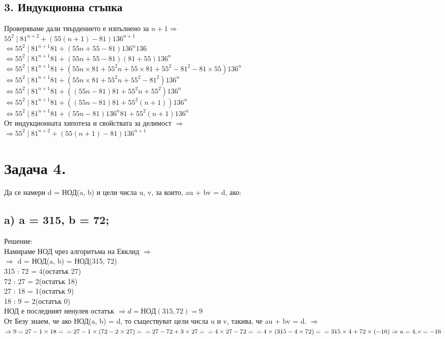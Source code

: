 \documentclass[10pt]{article}
\begin{document}
\subsection*{3. Индукционна стъпка}
Проверяваме дали твърдението е изпълнено за $n+1 \Rightarrow$\\
$55^2 \mid 81^{n+2} + (55(n + 1) -81)136^{n+1}$\\
$\Leftrightarrow 55^2 \mid 81^{n + 1}81 + (55n + 55 - 81)136^n136$\\
$\Leftrightarrow 55^2 \mid 81^{n + 1}81 + (55n + 55 - 81)(81 + 55)136^n$\\
$\Leftrightarrow 55^2 \mid 81^{n + 1}81 + (55n \times 81 + 55^2n + 55 \times 81 + 55^2 - 81^2 - 81 \times 55)136^n$\\
$\Leftrightarrow 55^2 \mid 81^{n + 1}81 + (55n \times 81 + 55^2n + 55^2 - 81^2)136^n$\\
$\Leftrightarrow 55^2 \mid 81^{n + 1}81 + ((55n - 81)81  + 55^2n + 55^2)136^n$\\
$\Leftrightarrow 55^2 \mid 81^{n + 1}81 + ((55n - 81)81  + 55^2(n + 1))136^n$\\
$\Leftrightarrow 55^2 \mid 81^{n + 1}81 + (55n - 81)136^n81  + 55^2(n + 1)136^n$\\
От индукционната хипотеза и свойствата за делимост $\Rightarrow$\\
$\Rightarrow 55^2 \mid 81^{n+2} + (55(n + 1) -81)136^{n+1}$

\section*{Задача 4.}
Да се намери d = НОД(a, b) и цели числа u, v, за които, au + bv = d, ако:\\
\subsection*{a) a = 315, b = 72;}
Решение:\\
Намираме НОД чрез алгоритъма на Евклид $\Rightarrow$\\
$\Rightarrow$ d = НОД(a, b) = НОД(315, 72)\\
315 : 72 = 4(остатък 27)\\
72 : 27 = 2(остатък 18)\\
27 : 18 = 1(остатък 9)\\
18 : 9 = 2(остатък 0)\\
НОД е последният ненулев остатък $\Rightarrow d = НОД(315, 72) = 9$\\
От Безу знаем, че ако НОД(a, b) = d, то съществуват цели числа u и v, такива, че au + bv = d. $\Rightarrow$\\
$\Rightarrow 9 = 27 - 1 \times 18 =\\
= 27 - 1 \times (72 - 2 \times 27) =\\
= 27 - 72 + 3 \times 27 =\\
= 4 \times 27 - 72 =\\
= 4 \times (315 - 4 \times 72) =\\
= 315 \times 4 + 72 \times (-16)\\
\Rightarrow u = 4, v = -16$
\end{document}

